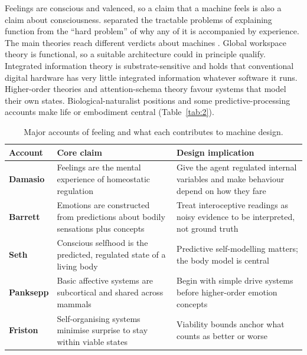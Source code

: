 \documentclass[twoside,11pt]{article}
\begin{document}
Feelings are conscious and valenced, so a claim that a machine feels is also a claim about consciousness. \citet{chalmers1995} separated the tractable problems of explaining function from the ``hard problem'' of why any of it is accompanied by experience. The main theories reach different verdicts about machines \citep{seth2022}. Global workspace theory \citep{baars1988,dehaene2014,mashour2020} is functional, so a suitable architecture could in principle qualify. Integrated information theory \citep{tononi2004,tononi2016} is substrate-sensitive and holds that conventional digital hardware has very little integrated information whatever software it runs. Higher-order theories \citep{rosenthal2005,lau2011} and attention-schema theory \citep{graziano2013} favour systems that model their own states. Biological-naturalist positions \citep{searle1980} and some predictive-processing accounts \citep{seth2021} make life or embodiment central (Table~\ref{tab:2}).

\begin{table}[!htbp]
\centering
\caption{Major accounts of feeling and what each contributes to machine design.}\label{tab:1}
\small
\renewcommand{\arraystretch}{1.2}
\begin{tabular}{>{\raggedright\arraybackslash}p{\dimexpr 0.1662\dimexpr\textwidth-6\tabcolsep\relax\relax}>{\raggedright\arraybackslash}p{\dimexpr 0.3878\dimexpr\textwidth-6\tabcolsep\relax\relax}>{\raggedright\arraybackslash}p{\dimexpr 0.4460\dimexpr\textwidth-6\tabcolsep\relax\relax}}
\toprule
\textbf{Account} & \textbf{Core claim} & \textbf{Design implication} \\
\midrule
\textbf{Damasio} & Feelings are the mental experience of homeostatic regulation & Give the agent regulated internal variables and make behaviour depend on how they fare \\
\textbf{Barrett} & Emotions are constructed from predictions about bodily sensations plus concepts & Treat interoceptive readings as noisy evidence to be interpreted, not ground truth \\
\textbf{Seth} & Conscious selfhood is the predicted, regulated state of a living body & Predictive self-modelling matters; the body model is central \\
\textbf{Panksepp} & Basic affective systems are subcortical and shared across mammals & Begin with simple drive systems before higher-order emotion concepts \\
\textbf{Friston} & Self-organising systems minimise surprise to stay within viable states & Viability bounds anchor what counts as better or worse \\
\bottomrule
\end{tabular}
\end{table}
\end{document}

